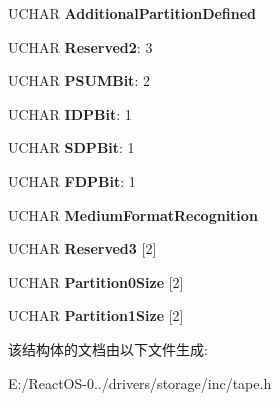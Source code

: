 \begin{DoxyCompactItemize}
U\+C\+H\+AR {\bfseries Additional\+Partition\+Defined}
\item 
\mbox{\label{struct___m_o_d_e___m_e_d_i_u_m___p_a_r_t_i_t_i_o_n___p_a_g_e_a577a83e00d330a51289cedc3159cbf72}} 
U\+C\+H\+AR {\bfseries Reserved2}\+: 3
\item 
\mbox{\label{struct___m_o_d_e___m_e_d_i_u_m___p_a_r_t_i_t_i_o_n___p_a_g_e_a467adad99d372e66467aaab47d00b71a}} 
U\+C\+H\+AR {\bfseries P\+S\+U\+M\+Bit}\+: 2
\item 
\mbox{\label{struct___m_o_d_e___m_e_d_i_u_m___p_a_r_t_i_t_i_o_n___p_a_g_e_a1117ae5baa765f2bee41781a85d97362}} 
U\+C\+H\+AR {\bfseries I\+D\+P\+Bit}\+: 1
\item 
\mbox{\label{struct___m_o_d_e___m_e_d_i_u_m___p_a_r_t_i_t_i_o_n___p_a_g_e_aadccceae24a3f172f0e083dc34a8e8e1}} 
U\+C\+H\+AR {\bfseries S\+D\+P\+Bit}\+: 1
\item 
\mbox{\label{struct___m_o_d_e___m_e_d_i_u_m___p_a_r_t_i_t_i_o_n___p_a_g_e_a6533973a4308436416558cd66ab6bb88}} 
U\+C\+H\+AR {\bfseries F\+D\+P\+Bit}\+: 1
\item 
\mbox{\label{struct___m_o_d_e___m_e_d_i_u_m___p_a_r_t_i_t_i_o_n___p_a_g_e_af2c8cf5b66328e6458b09b86cd1eff50}} 
U\+C\+H\+AR {\bfseries Medium\+Format\+Recognition}
\item 
\mbox{\label{struct___m_o_d_e___m_e_d_i_u_m___p_a_r_t_i_t_i_o_n___p_a_g_e_a6a7429a1cd381949ba3a38748cb1e3e9}} 
U\+C\+H\+AR {\bfseries Reserved3} \mbox{[}2\mbox{]}
\item 
\mbox{\label{struct___m_o_d_e___m_e_d_i_u_m___p_a_r_t_i_t_i_o_n___p_a_g_e_a648e7315b52d750e9197d070e03052e8}} 
U\+C\+H\+AR {\bfseries Partition0\+Size} \mbox{[}2\mbox{]}
\item 
\mbox{\label{struct___m_o_d_e___m_e_d_i_u_m___p_a_r_t_i_t_i_o_n___p_a_g_e_aba00676c34674d7498379e064873a2cd}} 
U\+C\+H\+AR {\bfseries Partition1\+Size} \mbox{[}2\mbox{]}
\end{DoxyCompactItemize}


该结构体的文档由以下文件生成\+:\begin{DoxyCompactItemize}
\item 
E\+:/\+React\+O\+S-\/0../drivers/storage/inc/tape.\+h\end{DoxyCompactItemize}
